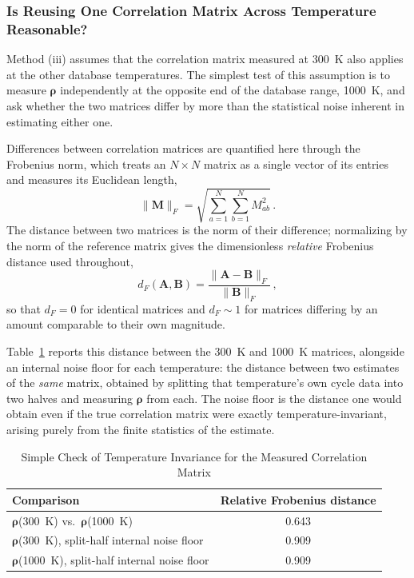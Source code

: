 \documentclass{style/nseJournal}
\begin{document}
\subsubsection{Is Reusing One Correlation Matrix Across Temperature Reasonable?}
\label{sec:t_invariance}

Method (iii) assumes that the correlation matrix measured at 300~K also applies at the other database temperatures. The simplest test of this assumption is to measure $\boldsymbol\rho$ independently at the opposite end of the database range, 1000~K, and ask whether the two matrices differ by more than the statistical noise inherent in estimating either one.

Differences between correlation matrices are quantified here through the Frobenius norm, which treats an $N\times N$ matrix as a single vector of its entries and measures its Euclidean length,
\begin{equation}
  \|\mathbf{M}\|_F = \sqrt{\sum_{a=1}^{N}\sum_{b=1}^{N} M_{ab}^2}\,.
  \label{eqn:frobenius_norm}
\end{equation}
The distance between two matrices is the norm of their difference; normalizing by the norm of the reference matrix gives the dimensionless \emph{relative} Frobenius distance used throughout,
\begin{equation}
  d_F(\mathbf{A},\mathbf{B}) = \frac{\|\mathbf{A}-\mathbf{B}\|_F}{\|\mathbf{B}\|_F}\,,
  \label{eqn:frobenius_rel}
\end{equation}
so that $d_F=0$ for identical matrices and $d_F\!\sim\!1$ for matrices differing by an amount comparable to their own magnitude.

Table~\ref{tab:t_invariance} reports this distance between the 300~K and 1000~K matrices, alongside an internal noise floor for each temperature: the distance between two estimates of the \emph{same} matrix, obtained by splitting that temperature's own cycle data into two halves and measuring $\boldsymbol\rho$ from each. The noise floor is the distance one would obtain even if the true correlation matrix were exactly temperature-invariant, arising purely from the finite statistics of the estimate.

\begin{table}[h]
\centering
\caption{Simple Check of Temperature Invariance for the Measured Correlation Matrix}
\label{tab:t_invariance}
\begin{tabular}{lc}
\hline
Comparison & Relative Frobenius distance \\ \hline
$\boldsymbol\rho$(300~K) vs.\ $\boldsymbol\rho$(1000~K) & 0.643 \\
$\boldsymbol\rho$(300~K), split-half internal noise floor & 0.909 \\
$\boldsymbol\rho$(1000~K), split-half internal noise floor & 0.909 \\ \hline
\end{tabular}
\end{table}
\end{document}
